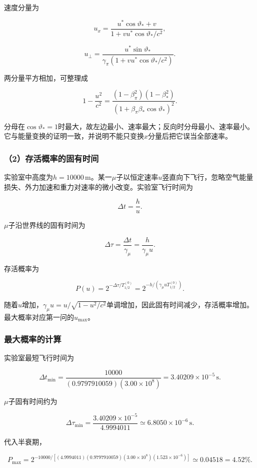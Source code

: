 \documentclass[12pt,a4paper,fontset=fandol]{ctexart}
\begin{document}
速度分量为

\[
u_x=\frac{u^*\cos\vartheta_*+v}
{1+vu^*\cos\vartheta_*/c^2},
\]

\[
u_\perp=\frac{u^*\sin\vartheta_*}
{\gamma_\pi(1+vu^*\cos\vartheta_*/c^2)}.
\]

两分量平方相加，可整理成

\[
1-\frac{u^2}{c^2}
=\frac{(1-\beta_\pi^2)(1-\beta_*^2)}
{(1+\beta_\pi\beta_*\cos\vartheta_*)^2}.
\]

分母在\(\cos\vartheta_*=1\)时最大，故左边最小、速率最大；反向时分母最小、速率最小。它与能量变换的证明一致，并说明不能只变换\(x\)分量后把它误当全部速率。

\subsubsection{（2）存活概率的固有时间}\label{ux5b58ux6d3bux6982ux7387ux7684ux56faux6709ux65f6ux95f4}

实验室中高度为\(h=10000\,\mathrm m\)。某一\(\mu\)子以恒定速率\(u\)竖直向下飞行，忽略空气能量损失、外力加速和重力对速率的微小改变。实验室飞行时间为

\[
\Delta t=\frac hu.
\]

\(\mu\)子沿世界线的固有时间为

\[
\Delta\tau=\frac{\Delta t}{\gamma_\mu}
=\frac{h}{\gamma_\mu u}.
\]

存活概率为

\[
\boxed{
P(u)=2^{-\Delta\tau/T_{1/2}^{(0)}}
=2^{-h/(\gamma_\mu uT_{1/2}^{(0)})}}.
\]

随着\(u\)增加，\(\gamma_\mu u=u/\sqrt{1-u^2/c^2}\)单调增加，因此固有时间减少，存活概率增加。最大概率对应第一问的\(u_{\max}\)。

\subsubsection{最大概率的计算}\label{ux6700ux5927ux6982ux7387ux7684ux8ba1ux7b97}

实验室最短飞行时间为

\[
\Delta t_{\min}
=\frac{10000}{(0.9797910059)(3.00\times10^8)}
=3.40209\times10^{-5}\,\mathrm s.
\]

\(\mu\)子固有时间约为

\[
\Delta\tau_{\min}
=\frac{3.40209\times10^{-5}}{4.9994011}
\simeq6.8050\times10^{-6}\,\mathrm s.
\]

代入半衰期，

\[
\boxed{
P_{\max}
=2^{-10000/
[(4.9994011)(0.9797910059)(3.00\times10^8)(1.523\times10^{-6})]}
\simeq0.04518=4.52\%}.
\]
\end{document}
